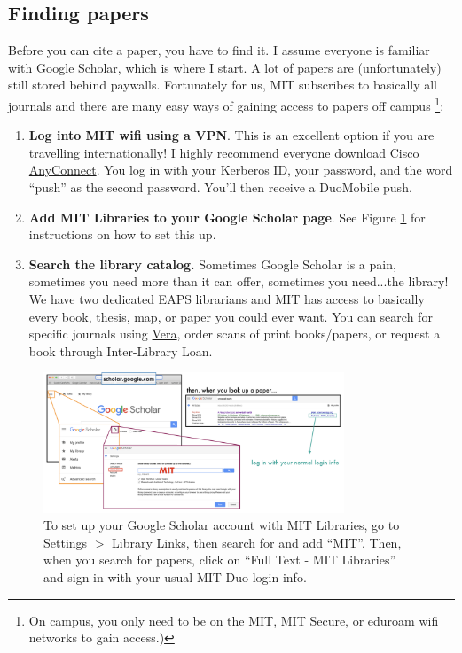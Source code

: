 \documentclass{article}
\begin{document}
\subsection*{Finding papers}
Before you can cite a paper, you have to find it. I assume everyone is familiar with \href{scholar.google.com}{Google Scholar}, which is where I start. A lot of papers are (unfortunately) still stored behind paywalls. Fortunately for us, MIT subscribes to basically all journals and there are many easy ways of gaining access to papers off campus \footnote{On campus, you only need to be on the MIT, MIT Secure, or eduroam wifi networks to gain access.)}:
\begin{enumerate}
    \item \textbf{Log into MIT wifi using a VPN}. This is an excellent option if you are travelling internationally! I highly recommend everyone download \href{https://ist.mit.edu/cisco-anyconnect}{Cisco AnyConnect}. You log in with your Kerberos ID, your password, and the word ``push'' as the second password. You'll then receive a DuoMobile push. 
    \item \textbf{Add MIT Libraries to your Google Scholar page}. See Figure \ref{fig:gs} for instructions on how to set this up.
    \item \textbf{Search the library catalog.} Sometimes Google Scholar is a pain, sometimes you need more than it can offer, sometimes you need...the library! We have two dedicated EAPS librarians and MIT has access to basically every book, thesis, map, or paper you could ever want. You can search for specific journals using \href{}{Vera}, order scans of print books/papers, or request a book through Inter-Library Loan. 
\end{enumerate}

\begin{figure}[h!]
    \centering
    \includegraphics[width=0.8\textwidth]{gs.png}
    \caption{To set up your Google Scholar account with MIT Libraries, go to Settings $>$ Library Links, then search for and add ``MIT''. Then, when you search for papers, click on ``Full Text - MIT Libraries'' and sign in with your usual MIT Duo login info.}
    \label{fig:gs}
\end{figure}
\end{document}
